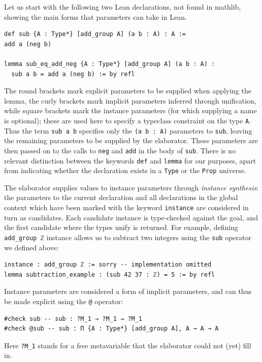 \documentclass[a4paper,UKenglish,cleveref, autoref, thm-restate]{lipics-v2021}
\newcommand{\mathlib}{\textsf{mathlib}\xspace}
\begin{document}
Let us start with the following two Lean declarations, not found in \mathlib, showing the main forms that parameters can take in Lean.
\begin{lstlisting}
def sub {A : Type*} [add_group A] (a b : A) : A :=
add a (neg b)

lemma sub_eq_add_neg {A : Type*} [add_group A] (a b : A) :
  sub a b = add a (neg b) := by refl
\end{lstlisting}
The round brackets mark explicit parameters to be supplied when applying the lemma,
the curly brackets mark implicit parameters inferred through unification,
while square brackets mark the instance parameters (for which supplying a name is optional);
these are used here to specify a typeclass constraint on the type \lstinline{A}.
Thus the term \lstinline{sub a b} specifies only the \lstinline{(a b : A)} parameters to \lstinline{sub},
leaving the remaining parameters to be supplied by the elaborator.
These parameters are then passed on to the calls to \lstinline{neg} and \lstinline{add} in the body of \lstinline{sub}.
There is no relevant distinction between the keywords \lstinline{def} and \lstinline{lemma} for our purposes,
apart from indicating whether the declaration exists in a \lstinline{Type} or the \lstinline{Prop} universe.

The elaborator supplies values to instance parameters through \emph{instance synthesis}:
the parameters to the current declaration and all declarations in the global context which have been marked with the keyword \lstinline{instance} are considered in turn as candidates.
Each candidate instance is type-checked against the goal, and the first candidate where the types unify is returned.
For example, defining \lstinline{add_group ℤ} instance allows us to subtract two integers using the \lstinline{sub} operator we defined above:
\begin{lstlisting}
instance : add_group ℤ := sorry -- implementation omitted
lemma subtraction_example : (sub 42 37 : ℤ) = 5 := by refl
\end{lstlisting}

Instance parameters are considered a form of implicit parameters, and can thus be made explicit using the \lstinline{@} operator:
\begin{lstlisting}
#check sub -- sub : ?M_1 → ?M_1 → ?M_1
#check @sub -- sub : Π {A : Type*} [add_group A], A → A → A
\end{lstlisting}
Here \lstinline{?M_1} stands for a free metavariable that the elaborator could not (yet) fill in.
\end{document}
